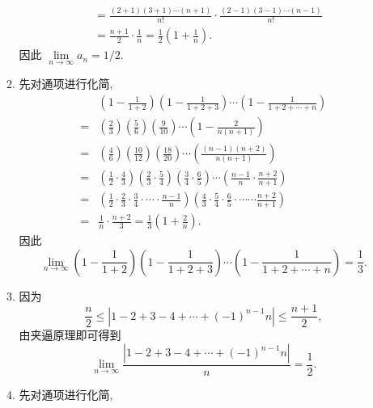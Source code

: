 \begin{enumerate}
\begin{enumerate}[(1)]
\begin{align*}
                        &= \frac{(2+1)(3+1)\cdots(n+1)}{n!} \cdot \frac{(2-1)(3-1)\cdots(n-1)}{n!} \\
                        &= \frac{n+1}{2} \cdot \frac{1}{n} = \frac 12\left(1 + \frac 1n \right).
                \end{align*}
                因此 $\lim\limits_{n\to\infty}a_n = 1/2$.
            \item
                先对通项进行化简,
                \begin{align*}
                        & \left(1 - \frac{1}{1+2}\right)\left(1 - \frac{1}{1+2+3}\right)\cdots\left(1-\frac{1}{1+2+\cdots+n}\right) \\
                    ={} & \left(\frac{2}{3}\right)\left(\frac{5}{6}\right) \left(\frac{9}{10}\right) \cdots\left(1-\frac{2}{n(n+1)}\right) \\
                    ={} & \left(\frac{4}{6}\right) \left(\frac{10}{12}\right) \left(\frac{18}{20}\right) \cdots \left(\frac{(n-1)(n+2)}{n(n+1)}\right) \\
                    ={} & \left(\frac12 \cdot \frac43\right) \left(\frac23\cdot\frac54\right) \left(\frac34\cdot\frac65\right) \cdots \left(\frac{n-1}{n} \cdot \frac{n+2}{n+1}\right) \\
                    ={} & \left(\frac12 \cdot \frac23 \cdot \frac34 \cdot \cdots \cdot \frac{n-1}{n} \right)\left(\frac43 \cdot \frac54 \cdot \frac65 \cdot \cdots \cdots \frac{n+2}{n+1} \right) \\
                    ={} & \frac{1}{n} \cdot \frac{n+2}{3} = \frac 13 \left(1 + \frac 2n\right).
                \end{align*}
                因此
                \begin{equation*}
                    \lim\limits_{n\to\infty}\left(1 - \frac{1}{1+2}\right)\left(1 - \frac{1}{1+2+3}\right)\cdots\left(1-\frac{1}{1+2+\cdots+n}\right) = \frac13.
                \end{equation*}
            \item 
                因为
                \[
                    \frac{n}{2} \leqslant |1 - 2 + 3 - 4 + \cdots + (-1)^{n-1}n| \leqslant \frac{n+1}{2},
                \]
                由夹逼原理即可得到
                \[
                    \lim\limits_{n\to\infty}\frac{|1 - 2 + 3 - 4 + \cdots + (-1)^{n-1}n|}{n} = \frac 12.
                \]
            \item
                先对通项进行化简,
                \begin{align*}

\end{align*}
\end{enumerate}
\end{enumerate}
